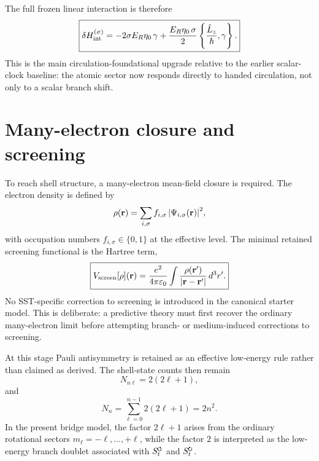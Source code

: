 \documentclass[11pt,a4paper]{article}
\newcommand{\swirlarrow}{\mathchoice{\mkern-2mu\scriptstyle\boldsymbol{\circlearrowleft}}{\mkern-2mu\scriptstyle\boldsymbol{\circlearrowleft}}{\mkern-2mu\scriptscriptstyle\boldsymbol{\circlearrowleft}}{\mkern-2mu\scriptscriptstyle\boldsymbol{\circlearrowleft}}}
\newcommand{\swirlarrowcw}{\mathchoice{\mkern-2mu\scriptstyle\boldsymbol{\circlearrowright}}{\mkern-2mu\scriptstyle\boldsymbol{\circlearrowright}}{\mkern-2mu\scriptscriptstyle\boldsymbol{\circlearrowright}}{\mkern-2mu\scriptscriptstyle\boldsymbol{\circlearrowright}}}
\newcommand{\SwirlClock}{S_t^{\swirlarrow}}
\newcommand{\SwirlClockcw}{S_t^{\swirlarrowcw}}
\begin{document}
The full frozen linear interaction is therefore
\begin{equation}
\label{eq:HintTotal}
\boxed{
\delta H_{\rm int}^{(\sigma)}
=
-2\sigma E_R\eta_0\,\gamma
+
\frac{E_R\eta_0\,\sigma}{2}
\left\{\frac{\hat L_z}{\hbar},\gamma\right\}.
}
\end{equation}
This is the main circulation-foundational upgrade relative to the earlier scalar-clock baseline: the atomic sector now responds directly to handed circulation, not only to a scalar branch shift.

\section{Many-electron closure and screening}
To reach shell structure, a many-electron mean-field closure is required. The electron density is defined by
\begin{equation}
\label{eq:rho-def}
\rho(\mathbf r)=\sum_{i,\sigma} f_{i,\sigma}\,\abs{\Psi_{i,\sigma}(\mathbf r)}^2,
\end{equation}
with occupation numbers $f_{i,\sigma}\in\{0,1\}$ at the effective level. The minimal retained screening functional is the Hartree term,
\begin{equation}
\label{eq:Vscreen}
\boxed{
V_{\rm screen}[\rho](\mathbf r)
=
\frac{e^2}{4\pi\varepsilon_0}
\int \frac{\rho(\mathbf r')}{\abs{\mathbf r-\mathbf r'}}\,d^3r'.
}
\end{equation}
No SST-specific correction to screening is introduced in the canonical starter model. This is deliberate: a predictive theory must first recover the ordinary many-electron limit before attempting branch- or medium-induced corrections to screening.

At this stage Pauli antisymmetry is retained as an effective low-energy rule rather than claimed as derived. The shell-state counts then remain
\begin{equation}
\label{eq:subshell-count}
N_{n\ell}=2(2\ell+1),
\end{equation}
and
\begin{equation}
\label{eq:shell-count}
N_n=\sum_{\ell=0}^{n-1}2(2\ell+1)=2n^2.
\end{equation}
In the present bridge model, the factor $2\ell+1$ arises from the ordinary rotational sectors $m_\ell=-\ell,\ldots,+\ell$, while the factor $2$ is interpreted as the low-energy branch doublet associated with $\SwirlClock$ and $\SwirlClockcw$.
\end{document}
